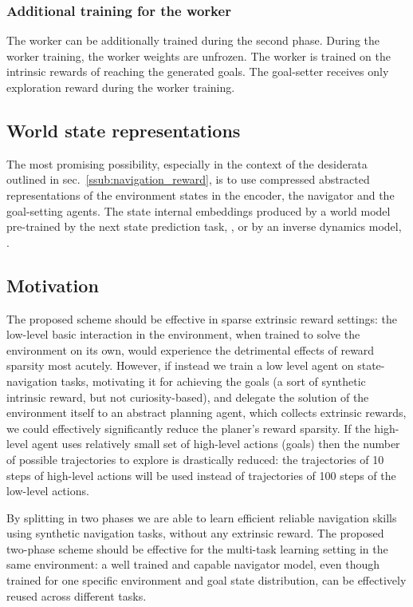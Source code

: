 \documentclass[acmsmall, nonacm]{acmart}
\begin{document}
\subsubsection{Additional training for the worker}

The worker can be additionally trained during the second phase. During the worker training, the worker weights are unfrozen. The worker is trained on the intrinsic rewards of reaching the generated goals. The goal-setter receives only exploration reward during the worker training.

\subsection{World state representations}

The most promising possibility, especially in the context of the desiderata outlined in sec.~\ref{ssub:navigation_reward}, is to use compressed abstracted representations of the environment states in the encoder, the navigator and the goal-setting agents. The state internal embeddings produced by a world model pre-trained by the next state prediction task, \citep{ha_recurrent_2018}, or by an inverse dynamics model, \citep{badia_never_2020}.


\subsection{Motivation}

The proposed scheme should be effective in sparse extrinsic reward settings: the low-level basic interaction in the environment, when trained to solve the environment on its own, would experience the detrimental effects of reward sparsity most acutely. However, if instead we train a low level agent on state-navigation tasks, motivating it for achieving the goals (a sort of synthetic intrinsic reward, but not curiosity-based), and delegate the solution of the environment itself to an abstract planning agent, which collects extrinsic rewards, we could effectively significantly reduce the planer's reward sparsity. If the high-level agent uses relatively small set of high-level actions (goals) then the number of possible trajectories to explore is drastically reduced: the trajectories of 10 steps of high-level actions will be used instead of trajectories of 100 steps of the low-level actions.

By splitting in two phases we are able to learn efficient reliable navigation skills using synthetic navigation tasks, 
without any extrinsic reward.
%
The proposed two-phase scheme should be effective for the multi-task learning setting in the same environment: a well trained and capable navigator model, even though trained for one specific environment and goal state distribution, can be effectively reused across different tasks.
\end{document}
